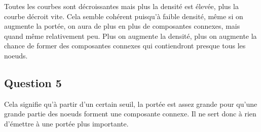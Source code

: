 \documentclass[paper=a4, fontsize=11pt]{article} %
\begin{document}
Toutes les courbes sont décroissantes mais plus la densité est élevée, plus la courbe décroit vite. Cela semble cohérent puisqu'à faible densité, même si on augmente la portée, on aura de plus en plus de composantes connexes, mais quand même relativement peu. Plus on augmente la densité, plus on augmente la chance de former des composantes connexes qui contiendront presque tous les noeuds. 


\subsection{Question 5}

Cela signifie qu'à partir d'un certain seuil, la portée est assez grande pour qu'une grande partie des noeuds forment une composante connexe. Il ne sert donc à rien d'émettre à une portée plus importante.
\end{document}
